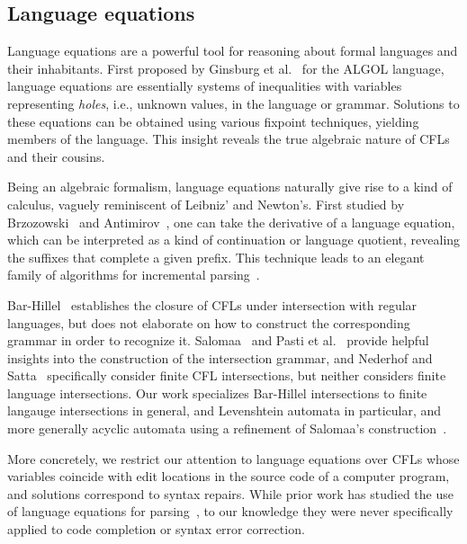 \documentclass[sigplan,review,acmsmall,nonacm,screen,anonymous]{acmart}\settopmatter{printfolios=false,printccs=false,printacmref=false}
\begin{document}
\clearpage\subsection{Language equations}

Language equations are a powerful tool for reasoning about formal languages and their inhabitants. First proposed by Ginsburg et al.~\cite{ginsburg1962two} for the ALGOL language, language equations are essentially systems of inequalities with variables representing \textit{holes}, i.e., unknown values, in the language or grammar. Solutions to these equations can be obtained using various fixpoint techniques, yielding members of the language. This insight reveals the true algebraic nature of CFLs and their cousins.

Being an algebraic formalism, language equations naturally give rise to a kind of calculus, vaguely reminiscent of Leibniz' and Newton's. First studied by Brzozowski~\cite{brzozowski1964derivatives, brzozowski1980equations} and Antimirov~\cite{antimirov1996partial}, one can take the derivative of a language equation, which can be interpreted as a kind of continuation or language quotient, revealing the suffixes that complete a given prefix. This technique leads to an elegant family of algorithms for incremental parsing~\cite{might2011parsing, adams2016complexity}.

Bar-Hillel~\cite{bar1961formal} establishes the closure of CFLs under intersection with regular languages, but does not elaborate on how to construct the corresponding grammar in order to recognize it. Salomaa~\cite{salomaa1973formal} and Pasti et al.~\cite{pasti2023intersection} provide helpful insights into the construction of the intersection grammar, and Nederhof and Satta~\cite{nederhof2004language} specifically consider finite CFL intersections, but neither considers finite language intersections. Our work specializes Bar-Hillel intersections to finite langauge intersections in general, and Levenshtein automata in particular, and more generally acyclic automata using a refinement of Salomaa's construction~\cite{salomaa1973formal}.

More concretely, we restrict our attention to language equations over CFLs whose variables coincide with edit locations in the source code of a computer program, and solutions correspond to syntax repairs. While prior work has studied the use of language equations for parsing~\cite{might2011parsing}, to our knowledge they were never specifically applied to code completion or syntax error correction.
\end{document}
